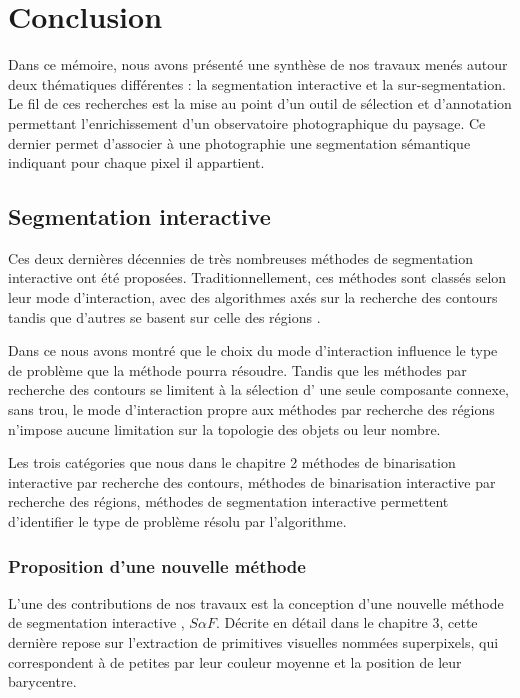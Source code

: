  \chapter{Conclusion}

Dans ce mémoire, nous avons présenté une synthèse de nos travaux menés autour deux thématiques  différentes : la segmentation interactive et la sur-segmentation. Le fil  de ces recherches est la mise au point d'un outil de sélection et d'annotation permettant l'enrichissement d'un observatoire photographique du paysage. Ce dernier permet d'associer à une photographie une segmentation sémantique indiquant pour chaque pixel  il appartient.

 
\section{Segmentation interactive}

Ces deux dernières décennies\modif{,} de très nombreuses méthodes de segmentation interactive ont été proposées. Traditionnellement, ces méthodes sont classés selon leur mode d'interaction, avec des algorithmes axés sur la recherche des contours \cite{mille2015combination,mortensen1995intelligent} tandis que d'autres se basent sur celle des régions \cite{jian2016interactive,mcguinness2010comparative,santner2010interactive}. 

Dans ce  nous avons montré que le choix du mode d'interaction influence le type de problème que la méthode pourra résoudre. Tandis que les méthodes par recherche des contours se limitent à la sélection d' une seule composante connexe, sans trou, le mode d'interaction propre aux méthodes par recherche des régions n'impose aucune limitation sur la topologie des objets ou leur nombre. 

Les trois catégories que nous  dans le chapitre 2 \modif{--} méthodes de binarisation interactive par recherche des contours, méthodes de binarisation interactive par recherche des régions, méthodes de segmentation interactive  \modif{--} permettent d'identifier le type de problème résolu par l'algorithme.

\subsection{Proposition d'une nouvelle méthode}
L'une des  contributions de nos travaux est la conception d'une nouvelle méthode de segmentation interactive , $S \alpha F$. Décrite en détail dans le chapitre 3, cette dernière repose sur l'extraction de primitives visuelles nommées superpixels, qui correspondent à de petites  par leur couleur moyenne et la position de leur barycentre. 

